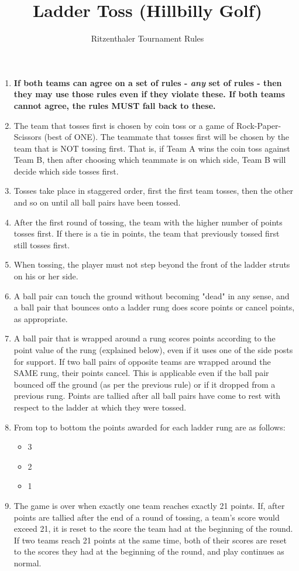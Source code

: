 \documentclass[a4paper]{article}
\title{Ladder Toss (Hillbilly Golf)}
\author{Ritzenthaler Tournament Rules}
\begin{document}
\maketitle
\begin{enumerate}
\item \textbf{If both teams can agree on a set of rules - \textit{any} set of rules - then they may use those rules even if they violate these. If both teams cannot agree, the rules MUST fall back to these.}
\item The team that tosses first is chosen by coin toss or a game of Rock-Paper-Scissors (best of ONE). The teammate that tosses first will be chosen by the team that is NOT tossing first. That is, if Team A wins the coin toss against Team B, then after choosing which teammate is on which side, Team B will decide which side tosses first.
\item Tosses take place in staggered order, first the first team tosses, then the other and so on until all ball pairs have been tossed.
\item After the first round of tossing, the team with the higher number of points tosses first. If there is a tie in points, the team that previously tossed first still tosses first.
\item When tossing, the player must not step beyond the front of the ladder struts on his or her side.
\item A ball pair can touch the ground without becoming "dead" in any sense, and a ball pair that bounces onto a ladder rung does score points or cancel points, as appropriate.
\item A ball pair that is wrapped around a rung scores points according to the point value of the rung (explained below), even if it uses one of the side posts for support. If two ball pairs of opposite teams are wrapped around the SAME rung, their points cancel. This is applicable even if the ball pair bounced off the ground (as per the previous rule) or if it dropped from a previous rung. Points are tallied after all ball pairs have come to rest with respect to the ladder at which they were tossed.
\item From top to bottom the points awarded for each ladder rung are as follows:
	\begin{itemize}
		\item 3
		\item 2
		\item 1
	\end{itemize}
\item The game is over when exactly one team reaches exactly 21 points. If, after points are tallied after the end of a round of tossing, a team's score would exceed 21, it is reset to the score the team had at the beginning of the round. If two teams reach 21 points at the same time, both of their scores are reset to the scores they had at the beginning of the round, and play continues as normal.
\end{enumerate}
\end{document}
